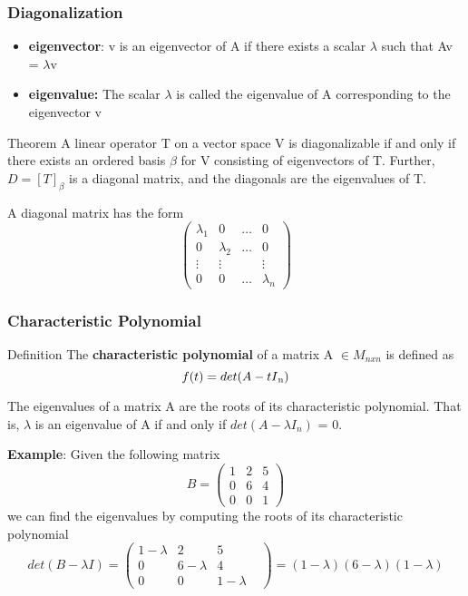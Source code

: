 \documentclass[11pt]{beamer}
\begin{document}
\begin{frame}
	\frametitle{Diagonalization}
	\begin{itemize}
		\item \textbf{eigenvector}: v is an eigenvector of A if there exists a scalar $\lambda$ such that Av = $\lambda$v
		\item \textbf{eigenvalue:} The scalar $\lambda$ is called the eigenvalue of A corresponding to the eigenvector v
	\end{itemize}
	\begin{block}{Theorem}
		A linear operator T on a vector space V is diagonalizable if and only if there exists an ordered basis $\beta$ for V consisting of eigenvectors of T. Further, $D = \left[T\right]_{\beta}$ is a diagonal matrix, and the diagonals are the eigenvalues of T.
	\end{block}

	A diagonal matrix has the form
	\[ 
		\begin{pmatrix}
			\lambda_{1} & 	0 			& \ldots   & 	0 \\
			0		    & \lambda_{2}   & \ldots  & 0 \\
			\vdots	    & \vdots 		& 		& \vdots \\
			0		    & 0			    & \ldots  & \lambda_{n}
		\end{pmatrix}
	\]

\end{frame}

\begin{frame}
	\frametitle{Characteristic Polynomial}
	\begin{block}{Definition}
		The \textbf{characteristic polynomial} of a matrix A $\in M_{nxn}$ is defined as  
		\[f(t) =det(A-tI\textsubscript{n}) \]
	\end{block}

	The eigenvalues of a matrix A are the roots of its characteristic polynomial. That is, $\lambda$ is an eigenvalue of A if and only if $ det(A-\lambda I_{n}) $ = 0.

	\textbf{Example}: Given the following matrix
	\[ B = 
		\begin{pmatrix}
			1 & 2 & 5 \\
			0 & 6 & 4 \\
			0 & 0 & 1
		\end{pmatrix}
	\]
	we can find the eigenvalues by computing the roots of its characteristic polynomial
	\[
		det(B-\lambda I) = 
			\begin{pmatrix}
				1 - \lambda & 2 & 5 \\
				0 & 6 - \lambda & 4 & \\
				0 & 0 & 1 - \lambda
			\end{pmatrix} 
		= (1-\lambda)(6-\lambda)(1-\lambda) 
	\]
\end{frame}
\end{document}
